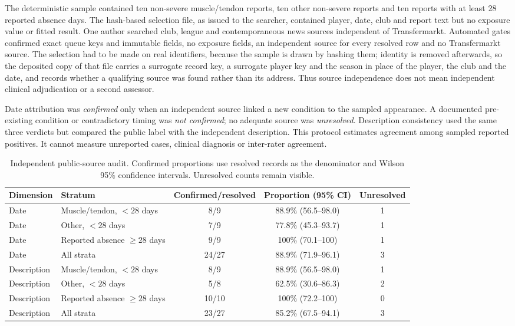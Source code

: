\documentclass[11pt]{article}
\begin{document}
The deterministic sample contained ten non-severe muscle/tendon reports, ten other non-severe reports and ten reports with at least 28 reported absence days. The hash-based selection file, as issued to the searcher, contained player, date, club and report text but no exposure value or fitted result. One author searched club, league and contemporaneous news sources independent of Transfermarkt. Automated gates confirmed exact queue keys and immutable fields, no exposure fields, an independent source for every resolved row and no Transfermarkt source. The selection had to be made on real identifiers, because the sample is drawn by hashing them; identity is removed afterwards, so the deposited copy of that file carries a surrogate record key, a surrogate player key and the season in place of the player, the club and the date, and records whether a qualifying source was found rather than its address. Thus source independence does not mean independent clinical adjudication or a second assessor.

Date attribution was \emph{confirmed} only when an independent source linked a new condition to the sampled appearance. A documented pre-existing condition or contradictory timing was \emph{not confirmed}; no adequate source was \emph{unresolved}. Description consistency used the same three verdicts but compared the public label with the independent description. This protocol estimates agreement among sampled reported positives. It cannot measure unreported cases, clinical diagnosis or inter-rater agreement.

\begin{table}[h]
\centering
\caption{Independent public-source audit. Confirmed proportions use resolved records as the denominator and Wilson 95\% confidence intervals. Unresolved counts remain visible.}
\label{tab:supp_audit}
\small
\begin{tabular}{llccc}
\toprule
Dimension & Stratum & Confirmed/resolved & Proportion (95\% CI) & Unresolved\\
\midrule
Date & Muscle/tendon, $<28$ days & 8/9 & 88.9\% (56.5--98.0) & 1\\
Date & Other, $<28$ days & 7/9 & 77.8\% (45.3--93.7) & 1\\
Date & Reported absence $\geq28$ days & 9/9 & 100\% (70.1--100) & 1\\
Date & All strata & 24/27 & 88.9\% (71.9--96.1) & 3\\
Description & Muscle/tendon, $<28$ days & 8/9 & 88.9\% (56.5--98.0) & 1\\
Description & Other, $<28$ days & 5/8 & 62.5\% (30.6--86.3) & 2\\
Description & Reported absence $\geq28$ days & 10/10 & 100\% (72.2--100) & 0\\
Description & All strata & 23/27 & 85.2\% (67.5--94.1) & 3\\
\bottomrule
\end{tabular}
\end{table}
\end{document}

